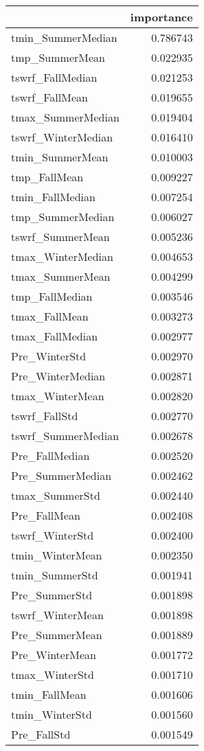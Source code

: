 \begin{tabular}{lr}
\toprule
 & importance \\
\midrule
tmin_SummerMedian & 0.786743 \\
tmp_SummerMean & 0.022935 \\
tswrf_FallMedian & 0.021253 \\
tswrf_FallMean & 0.019655 \\
tmax_SummerMedian & 0.019404 \\
tswrf_WinterMedian & 0.016410 \\
tmin_SummerMean & 0.010003 \\
tmp_FallMean & 0.009227 \\
tmin_FallMedian & 0.007254 \\
tmp_SummerMedian & 0.006027 \\
tswrf_SummerMean & 0.005236 \\
tmax_WinterMedian & 0.004653 \\
tmax_SummerMean & 0.004299 \\
tmp_FallMedian & 0.003546 \\
tmax_FallMean & 0.003273 \\
tmax_FallMedian & 0.002977 \\
Pre_WinterStd & 0.002970 \\
Pre_WinterMedian & 0.002871 \\
tmax_WinterMean & 0.002820 \\
tswrf_FallStd & 0.002770 \\
tswrf_SummerMedian & 0.002678 \\
Pre_FallMedian & 0.002520 \\
Pre_SummerMedian & 0.002462 \\
tmax_SummerStd & 0.002440 \\
Pre_FallMean & 0.002408 \\
tswrf_WinterStd & 0.002400 \\
tmin_WinterMean & 0.002350 \\
tmin_SummerStd & 0.001941 \\
Pre_SummerStd & 0.001898 \\
tswrf_WinterMean & 0.001898 \\
Pre_SummerMean & 0.001889 \\
Pre_WinterMean & 0.001772 \\
tmax_WinterStd & 0.001710 \\
tmin_FallMean & 0.001606 \\
tmin_WinterStd & 0.001560 \\
Pre_FallStd & 0.001549 \\

\end{tabular}
